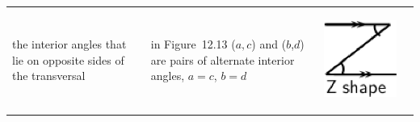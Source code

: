 \begin{center}
\begin{xtabular*}{\mytablewidth}[t]{|p{3cm}|p{3cm}|p{3cm}|p{20\mystarwidth}|}
    
        the interior angles that lie on opposite sides of the transversal &
    
    
        in Figure~12.13 (\begin{math}a,c\end{math}) and (\begin{math}b\end{math},\begin{math}d\end{math}) are pairs of alternate interior angles, \begin{math}a=c\end{math}, \begin{math}b=d\end{math} &
    
    
        
                  
    \setcounter{subfigure}{0}

\label{m39370*id316794}
    \begin{center}
    \label{m39370*id316794!!!underscore!!!media}\label{m39370*id316794!!!underscore!!!printimage}\includegraphics[width=.2\columnwidth]{col11306.imgs/m39370_MG10C13_012.png} %
        
      \vspace{2pt}
    \vspace{.1in}
    
    \end{center}



    \addtocounter{footnote}{-0}
    
     \tabularnewline{}
    

\end{xtabular*}
\end{center}

